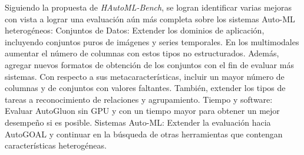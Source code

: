 \begin{recomendations}
Siguiendo la propuesta de \textit{HAutoML-Bench}, se logran identificar varias mejoras con vista a lograr una evaluación aún más completa sobre los 
sistemas Auto-ML heterogéneos: 
\newline
\newline
Conjuntos de Datos: Extender los dominios de aplicación, incluyendo conjuntos puros de imágenes y series temporales. En los multimodales
aumentar el número de columnas con estos tipos no estructurados. Además, agregar nuevos formatos de obtención de los conjuntos con el fin de 
evaluar más sistemas. Con respecto a sus metacaracterísticas, incluir un mayor número de columnas y de conjuntos con valores faltantes.
También, extender los tipos de tareas a reconocimiento de relaciones y agrupamiento. 
\newline
\newline
Tiempo y software: Evaluar AutoGluon sin GPU y con un tiempo mayor para obtener un mejor desempeño si es posible.
\newline
\newline
Sistemas Auto-ML: Extender la evaluación hacia AutoGOAL y continuar en la búsqueda de otras herramientas que contengan características heterogéneas.
\end{recomendations}
